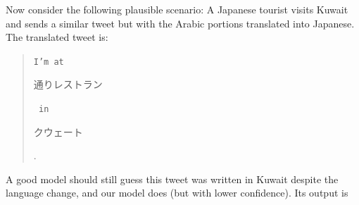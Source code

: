 \documentclass[sigconf,anonymous,review,10pt]{acmart}
\newcommand{\str}[1]{\texttt{#1}}
\begin{document}
\begin{description}
\noindent


Now consider the following plausible scenario:
A Japanese tourist visits Kuwait and sends a similar tweet but with the Arabic portions translated into Japanese.
The translated tweet is:
\begin{quote}
\str{I'm at }\begin{CJK}{UTF8}{min}通りレストラン\end{CJK}\str{ in }\begin{CJK}{UTF8}{min}クウェート\end{CJK}.
\end{quote}
A good model should still guess this tweet was written in Kuwait despite the language change,
and our model does (but with lower confidence).
Its output is


\end{description}
\end{document}
